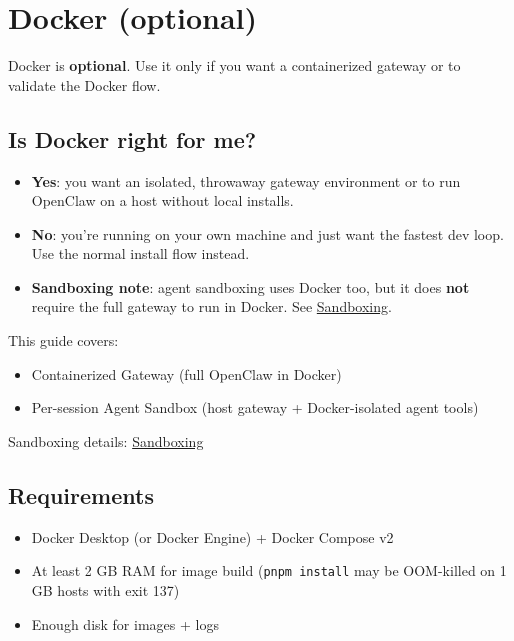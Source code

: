 \clearpage

\section{Docker (optional)}


Docker is \textbf{optional}. Use it only if you want a containerized gateway or to validate the Docker flow.

\subsection{Is Docker right for me?}


\begin{itemize}
  \item \textbf{Yes}: you want an isolated, throwaway gateway environment or to run OpenClaw on a host without local installs.
  \item \textbf{No}: you’re running on your own machine and just want the fastest dev loop. Use the normal install flow instead.
  \item \textbf{Sandboxing note}: agent sandboxing uses Docker too, but it does \textbf{not} require the full gateway to run in Docker. See \href{/gateway/sandboxing}{Sandboxing}.
\end{itemize}


This guide covers:

\begin{itemize}
  \item Containerized Gateway (full OpenClaw in Docker)
  \item Per-session Agent Sandbox (host gateway + Docker-isolated agent tools)
\end{itemize}


Sandboxing details: \href{/gateway/sandboxing}{Sandboxing}

\subsection{Requirements}


\begin{itemize}
  \item Docker Desktop (or Docker Engine) + Docker Compose v2
  \item At least 2 GB RAM for image build (\texttt{pnpm install} may be OOM-killed on 1 GB hosts with exit 137)
  \item Enough disk for images + logs
\end{itemize}


